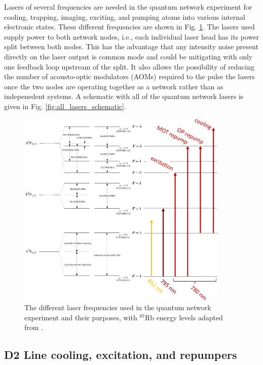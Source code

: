 Lasers of several frequencies are needed in the quantum network experiment for cooling, trapping, imaging, exciting, and pumping atoms into various internal electronic states. These different frequencies are shown in Fig. \ref{fig:laser_frequencies}. The lasers used supply power to both network nodes, i.e., each individual laser head has its power split between both nodes. This has the advantage that any intensity noise present directly on the laser output is common mode and could be mitigating with only one feedback loop upstream of the split. It also allows the possibility of reducing the number of acousto-optic modulators (AOMs) required to the pulse the lasers once the two nodes are operating together as a network rather than as indepenedent systems. A schematic with all of the quantum network lasers is given in Fig. \ref{fig:all_lasers_schematic}. 
\begin{figure}[h!]
    \centering
    \includegraphics[width=0.9\textwidth]{Images/laser_frequencies.pdf}
    \caption{The different laser frequencies used in the quantum network experiment and their purposes, with $^{87}$Rb energy levels adapted from \cite{steck2001rubidium}.}
    \label{fig:laser_frequencies}
\end{figure}

\subsection{D2 Line cooling, excitation, and repumpers}

